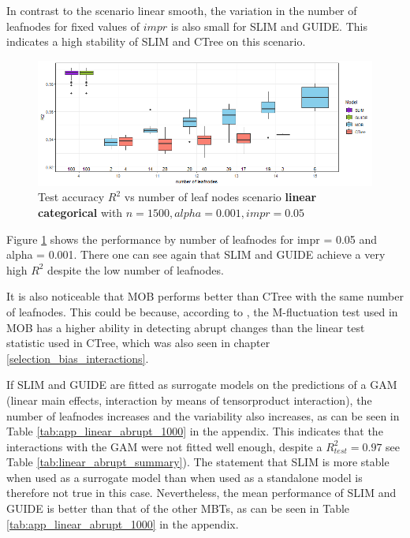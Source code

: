 In contrast to the scenario linear smooth, the variation in the number of leafnodes for fixed values of $impr$ is also small for SLIM and GUIDE. This indicates a high stability of SLIM and CTree on this scenario. 



\begin{figure}[!htb]
\centering
    \includegraphics[width=14cm]{Figures/simulations/batchtools/basic_scenarios/linear_abrupt/la_1000_standalone_r2_test.png}
    \caption{Test accuracy $R^2$ vs number of leaf nodes scenario     
\textbf{linear categorical} with $n=1500, alpha = 0.001, impr = 0.05$}
    \label{fig:la_1000_standalone_r2_test}

\end{figure} 

Figure \ref{fig:la_1000_standalone_r2_test} shows the performance by number of leafnodes for impr = 0.05 and alpha = 0.001. There one can see again that SLIM and GUIDE achieve a very high $R^2$ despite the low number of leafnodes. 

It is also noticeable that MOB performs better than CTree with the same number of leafnodes.
This could be because, according to \citep{Schlosser.2019}, the M-fluctuation test used in MOB has a higher ability in detecting abrupt changes than the linear test statistic used in CTree, which was also seen in chapter \ref{selection_bias_interactions}.



If SLIM and GUIDE are fitted as surrogate models on the predictions of a GAM (linear main effects, interaction by means of tensorproduct interaction), the number of leafnodes increases and the variability also increases, as can be seen in Table \ref{tab:app_linear_abrupt_1000} in the appendix. This indicates that the interactions with the GAM were not fitted well enough, despite a  $R^2_{test} = 0.97$ see Table \ref{tab:linear_abrupt_summary}). The statement that SLIM is more stable when used as a surrogate model than when used as a standalone model \citep{Hu.2020} is therefore not true in this case.
Nevertheless, the mean performance of SLIM and GUIDE is better than that of the other MBTs, as can be seen in Table \ref{tab:app_linear_abrupt_1000} in the appendix.




